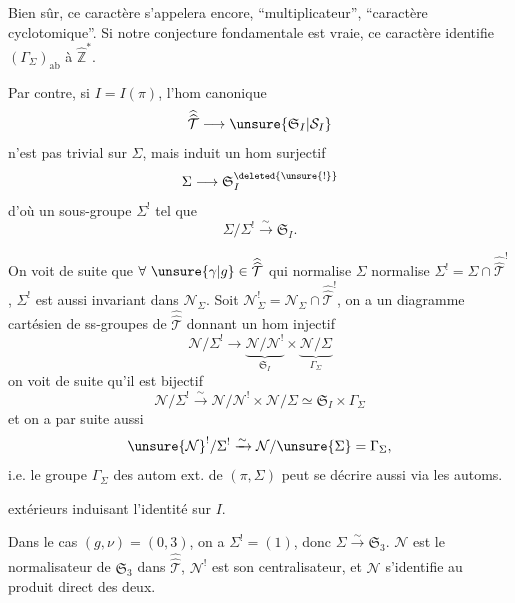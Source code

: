 
Bien sûr, ce caractère s'appelera encore, ``multiplicateur'',  ``caractère cyclotomique''.  Si notre conjecture fondamentale est vraie, ce caractère identifie $(\Gamma_\Sigma)_{\mathrm{ab}}$ à $\widehat{\mathbb Z}^{*}$.

Par contre, si $I=I(\pi)$, l'hom canonique
\[
\widehat{\widehat{\mathcal T}}\longrightarrow\unsure{\mathfrak S_I|\mathcal S_I}
\]
n'est  pas trivial sur $\Sigma$, mais induit un hom surjectif
\[
\Sigma\longrightarrow\mathfrak S_I^{\deleted{\unsure{!}}}
\]
d'où un sous-groupe $\Sigma^!$ tel que
\[
\Sigma/\Sigma^!\xrightarrow{\sim}\mathfrak S_I.
\]

On voit de suite que $\forall\ \unsure{\gamma|g}\in\widehat{\widehat{\mathcal T}}$ qui normalise $\Sigma$ normalise $\Sigma^!=\Sigma\cap\widehat{\widehat{\mathcal T}}^!$,  $\Sigma^!$ est aussi invariant dans $\mathcal N_\Sigma$.  Soit $\mathcal N_\Sigma^!=\mathcal N_\Sigma\cap\widehat{\widehat{\mathcal T}}^!$, on a un diagramme cartésien de ss-groupes de $\widehat{\widehat{\mathcal T}}$
donnant un hom injectif
\[
\mathcal N/\Sigma^!\longrightarrow
\underbrace{\mathcal N/\mathcal N^!}_{\mathfrak S_I}\times
\underbrace{\mathcal N/\Sigma}_{\Gamma_\Sigma}
\]
 on voit de suite qu'il est bijectif
\[
\mathcal N/\Sigma^!\xrightarrow{\sim}\mathcal N/\mathcal N^!\times\mathcal N/\Sigma\simeq\mathfrak S_I\times\Gamma_\Sigma
\]
et on a par suite aussi
\[
\unsure{\mathcal N}^!/\Sigma^!\xrightarrow{\sim}\mathcal N/\unsure{\Sigma}=\Gamma_\Sigma,
\]
i.e. le groupe $\Gamma_\Sigma$ des autom  ext. de $(\pi,\Sigma)$ peut se décrire aussi via les automs.


extérieurs induisant l'identité sur $I$.

Dans le cas $(g,\nu)=(0,3)$, on a $\Sigma^!=(1)$, \unsure{$\Rightarrow$} donc $\Sigma\xrightarrow{\sim}\mathfrak S_3$. $\mathcal N$ est le  normalisateur de $\mathfrak S_3$ dans $\widehat{\widehat{\mathcal T}}$, $\mathcal N^!$ \inserted{$\unsure{\xrightarrow{\sim}}\Gamma_\Sigma$} est son centralisateur, et $\mathcal N$ s'identifie au produit direct des deux.

